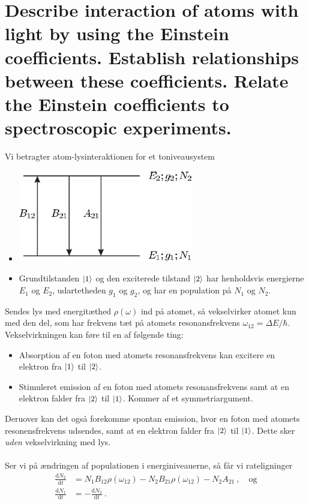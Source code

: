 \section{Describe interaction of atoms with light by using the Einstein coefficients. Establish relationships between these coefficients. Relate the Einstein coefficients to spectroscopic experiments.}

\noindent
\large
Vi betragter atom-lysinteraktionen for et toniveausystem
\begin{itemize}
    \item \includegraphics[width=0.6\textwidth]{Q02/images/TwoLevelSystem2.PNG}
    \item Grundtilstanden $\ket{1}$ og den exciterede tilstand $\ket{2}$ har henholdsvis energierne $E_1$ og $E_2$, udartetheden $g_1$ og $g_2$, og har en population på $N_1$ og $N_2$.
\end{itemize}
Sendes lys med energitæthed $\rho(\omega)$ ind på atomet, så vekselvirker atomet kun med den del, som har frekvens tæt på atomets resonansfrekvens $\omega_{12} = \Delta E / \hbar$. Vekselvirkningen kan føre til en af følgende ting:
\begin{itemize}
    \item Absorption af en foton med atomets resonansfrekvens kan excitere en elektron fra $\ket{1}$ til $\ket{2}$.
    \item Stimuleret emission af en foton med atomets resonansfrekvens samt at en elektron falder fra $\ket{2}$ til $\ket{1}$. Kommer af et symmetriargument.
\end{itemize}
Deruover kan det også forekomme spontan emission, hvor en foton med atomets resonensfrekvens udsendes, samt at en elektron falder fra $\ket{2}$ til $\ket{1}$. Dette sker \emph{uden} vekselvirkning med lys.\\\\
%
Ser vi på ændringen af populationen i energiniveauerne, så får vi rateligninger
\begin{align*}
    \frac{\text{d}N_2}{\text{d}t} &= N_1 B_{12} \rho(\omega_{12}) - N_2 B_{21} \rho(\omega_{12}) - N_2 A_{21} \: , \quad \text{og} \\
    \frac{\text{d}N_1}{\text{d}t} &= - \frac{\text{d}N_2}{\text{d}t} \: .
\end{align*}
